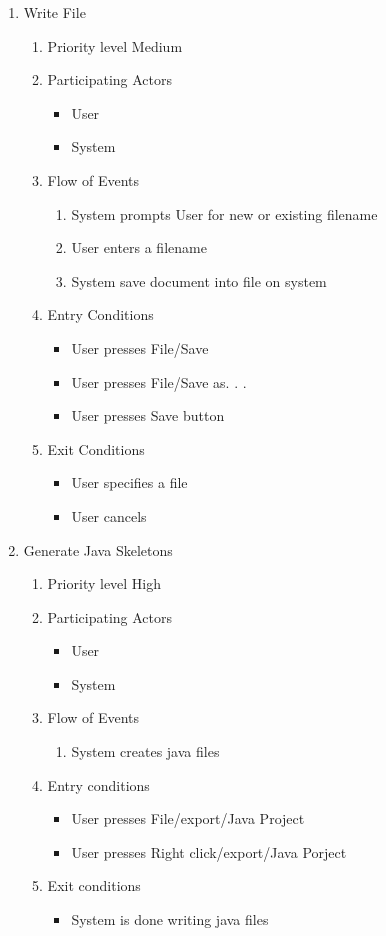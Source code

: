 \documentclass[a4paper, 12pt]{article}
\begin{document}
\begin{enumerate}
\item Write File
  \begin {enumerate}
  \item Priority level Medium
  \item Participating Actors
    \begin {itemize}
    \item User
    \item System
    \end {itemize}
  \item Flow of Events
    \begin {enumerate}
    \item System prompts User for new or existing filename
    \item User enters a filename
    \item System save document into file on system
    \end {enumerate}
  \item Entry Conditions
    \begin {itemize}
    \item User presses File/Save
    \item User presses File/Save as. . .
    \item User presses Save button
    \end {itemize}
  \item Exit Conditions
    \begin {itemize}
    \item User specifies a file
    \item User cancels
    \end {itemize}
  \end {enumerate}



\item Generate Java Skeletons
  \begin {enumerate}
  \item Priority level High
  \item Participating Actors
    \begin {itemize}
    \item User
    \item System
    \end {itemize}
  \item Flow of Events
    \begin {enumerate}
    \item System creates java files
    \end {enumerate}
  \item Entry conditions
    \begin {itemize}
    \item User presses File/export/Java Project
    \item User presses Right click/export/Java Porject
    \end {itemize}
  \item Exit conditions
    \begin {itemize}
    \item System is done writing java files
    \end{itemize}
  \end {enumerate}


\end{enumerate}
\end{document}
